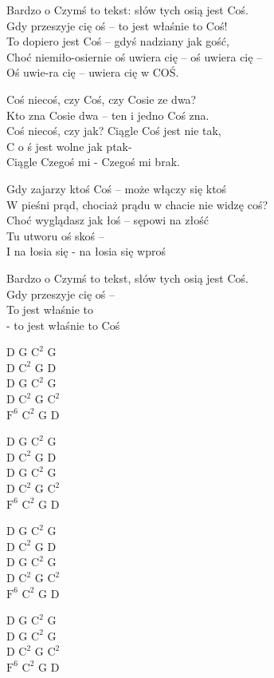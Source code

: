 \begin{text}
Bardzo o Czymś to tekst: słów tych osią jest Coś.\\
Gdy przeszyje cię oś – to jest właśnie to Coś!\\
To dopiero jest Coś – gdyś nadziany jak gość,\\
Choć niemiło-osiernie oś uwiera cię – oś uwiera cię –\\
Oś uwie-ra cię – uwiera cię w COŚ.

Coś niecoś, czy Coś, czy Cosie ze dwa?\\
Kto zna Cosie dwa – ten i jedno Coś zna.\\
Coś niecoś, czy jak? Ciągle Coś jest nie tak,\\
C o ś jest wolne jak ptak-\\
Ciągle Czegoś mi - Czegoś mi brak.

Gdy zajarzy ktoś Coś – może włączy się ktoś\\
W pieśni prąd, chociaż prądu w chacie nie widzę coś?\\
Choć wyglądasz jak łoś – sępowi na złość\\
Tu utworu oś skoś –\\
I na łosia się - na łosia się wproś

Bardzo o Czymś to tekst, słów tych osią jest Coś.\\
Gdy przeszyje cię oś –\\
To jest właśnie to\\
- to jest właśnie to Coś
\end{text}
\begin{chord}
    D G $\mathrm{C^2}$ G\\
    D $\mathrm{C^2}$ G D\\
    D G $\mathrm{C^2}$ G\\
    D $\mathrm{C^2}$ G $\mathrm{C^2}$\\
    $\mathrm{F^6}$ $\mathrm{C^2}$ G D

    D G $\mathrm{C^2}$ G\\
    D $\mathrm{C^2}$ G D\\
    D G $\mathrm{C^2}$ G\\
    D $\mathrm{C^2}$ G $\mathrm{C^2}$\\
    $\mathrm{F^6}$ $\mathrm{C^2}$ G D

    D G $\mathrm{C^2}$ G\\
    D $\mathrm{C^2}$ G D\\
    D G $\mathrm{C^2}$ G\\
    D $\mathrm{C^2}$ G $\mathrm{C^2}$\\
    $\mathrm{F^6}$ $\mathrm{C^2}$ G D

    D G $\mathrm{C^2}$ G\\
    D G $\mathrm{C^2}$ G\\
    D $\mathrm{C^2}$ G $\mathrm{C^2}$\\
    $\mathrm{F^6}$ $\mathrm{C^2}$ G D
\end{chord}
